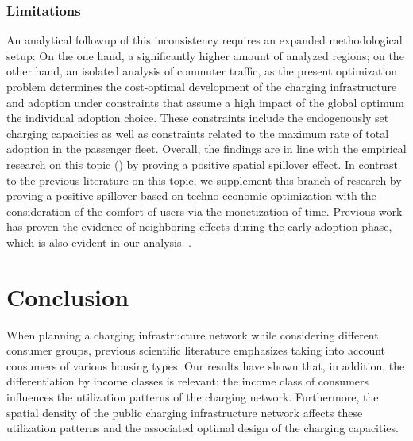 \documentclass[preprint,review,11pt, authoryear]{elsarticle}
\begin{document}
    \subsubsection{Limitations} \label{sec:lim_2}
    An analytical follow\added{-}up of this inconsistency requires an expanded methodological setup: On the one hand, a significantly higher amount of analyzed regions; on the other hand, an isolated analysis of commuter traffic, as the present optimization problem determines the cost-optimal development of the charging infrastructure and adoption under constraints that assume a high impact of the global optimum  the individual adoption choice. These constraints include the endogenously set charging capacities as well as constraints related to the maximum rate of total adoption in the passenger fleet.  
    Overall, the findings are in line with the empirical research on this topic (\cite{QIAN2024104400, SELENASHENG2022103256}) by proving a positive spatial spillover effect. In contrast to the previous literature on this topic, we supplement this branch of research by proving a positive spillover based on techno-economic optimization with the consideration of the comfort of users via the monetization of time. Previous work has proven the evidence of neighboring effects during the early adoption phase, which is also evident in our analysis.
    .
    
\section{Conclusion}

    When planning a charging infrastructure network while considering different consumer groups, previous scientific literature emphasizes taking into account consumers of various housing types. Our results have shown that, in addition, the differentiation by income classes is relevant:  the income class of consumers influences the utilization patterns of the charging network. Furthermore, the spatial density of the public charging infrastructure network affects these utilization patterns and the associated optimal design of the charging capacities.
    
\end{document}

